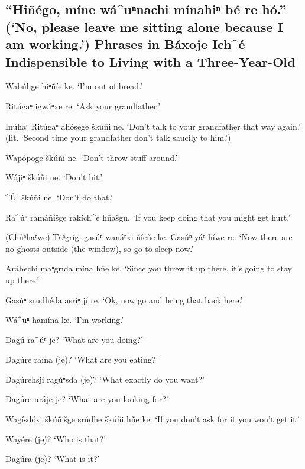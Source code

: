 \documentclass[output=paper]{LSP/langsci}
\begin{document}
\subsection*{``Hiñégo, míne wá\^{ }uⁿnachi mínahiⁿ bé re hó.''\newline{}
(`No, please leave me sitting alone because I am working.')\newline
Phrases in Báxoje Ich\^{ }é Indispensible to Living with a Three-Year-Old}
\begin{list}{}{} \itemsep1pt \parskip0pt 
\item{Wabúhge hiⁿñíe ke. `I'm out of bread.'}
\item{Ritúgaⁿ igwáⁿxe re. `Ask your grandfather.'}
\item{Inúhaⁿ Ritúgaⁿ ahósege škúñi ne. `Don't talk to your grandfather that way again.' (lit. `Second time your grandfather don't talk saucily to him.')}
\item{Wapópoge škúñi ne. `Don't throw stuff around.'}
\item{Wójiⁿ škúñi ne. `Don't hit.'}
\item{\^{ }\'Uⁿ škúñi ne. `Don't do that.'}
\item{}
\item{Ra\^{ }úⁿ ramáñišge rakích\^{ }e hñašgu. `If you keep doing that you might get hurt.'}
\item{(Chúⁿhaⁿwe) Táⁿgrigi gasúⁿ wanáⁿxi ñíeñe ke. Gasúⁿ yáⁿ híwe re. `Now there are no ghosts outside (the window), so go to sleep now.'}
\item{Arábechi maⁿgrída mína hñe ke. `Since you threw it up there, it's going to stay up there.'}
\item{Gasúⁿ srudhéda asríⁿ jí re. `Ok, now go and bring that back here.'}
\item{}
\item{Wá\^{ }uⁿ hamína ke.	`I'm working.'}
\item{Dagú ra\^{ }úⁿ je? `What are you doing?'}
\item{Dagúre raína (je)? `What are you eating?'}
\item{Dagúrehsji ragúⁿsda (je)? `What exactly do you want?'}
\item{Dagúre uráje je? `What are you looking for?'}
\item{Wagísdóxi škúñišge srúdhe škúñi hñe ke. `If you don't ask for it you won't get it.'}
\item{Wayére (je)? `Who is that?'}
\item{Dagúra (je)? `What is it?'}

\end{list}
\end{document}
